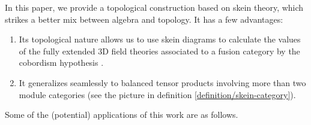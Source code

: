 In this paper, we provide a topological construction based on skein theory,
which strikes a better mix between algebra and topology. It has a few advantages:

\begin{enumerate}
  \item Its topological nature allows us to use skein diagrams to calculate the
        values of the fully extended $3$D field theories associated to a
        fusion category by the cobordism hypothesis \cite{lurie/tqft}
        \cite{douglas/dualizable-tensor-categories}
        \cite{guu/tv-as-3-functor}.
  \item It generalizes seamlessly to balanced tensor products involving more than
        two module categories (see the picture in definition
        \ref{definition/skein-category}).
      \end{enumerate}

\noindent Some of the (potential) applications of this work are as follows.

